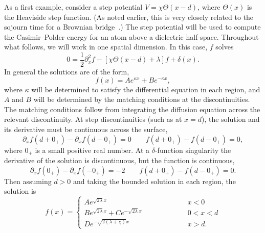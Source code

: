 As a first example, consider a step potential $V=\chi\Theta(x-d)$, where $\Theta(x)$ is the Heaviside step
function.  (As noted earlier, this is very closely related to the sojourn time for a Brownian bridge~\cite{Hooghiemstra2002}.)
The step potential will be used to compute the Casimir--Polder energy for an atom 
above a dielectric half-space.
Throughout what follows, we will work in one spatial dimension.  
In this case, $f$ solves
\begin{equation}
  0 = \frac{1}{2}\partial_x^2 f - [\chi\Theta(x-d)+\lambda]f + \delta(x).
\end{equation}
In general the solutions are of the form, 
\begin{equation}
  f(x) = A e^{\kappa x} + B e^{-\kappa x},
\end{equation}
where $\kappa$ will be determined to satisfy the differential equation in each region, and $A$ and $B$ will be determined by 
the matching conditions at the discontinuities.
The matching conditions follow from integrating the diffusion equation across the relevant discontinuity.  
At step discontinuities (such as at $x=d$), the solution and its derivative must be continuous across the surface,
    \begin{equation}
      \partial_xf(d+0_+) - \partial_x f(d-0_+) = 0 \qquad f(d+0_+)-f(d-0_+) = 0,  \label{eq:step_BC}
    \end{equation}
    where $0_+$ is a small positive real number.
At a $\delta$-function singularity the derivative of the solution is discontinuous, but the function
is continuous,
    \begin{equation}
      \partial_xf(0_+) -\partial_x f(-0_+) = -2  \qquad f(d+0_+)-f(d-0_+) = 0.\label{eq:delta_BC}
    \end{equation}
    Then assuming $d>0$ and taking the bounded solution in each region, the solution is 
\begin{equation}
  f(x) =\left\{ 
    \begin{array}{lcr}  A e^{\sqrt{2\lambda} x} & \hspace{2cm} & x<0\\
      B e^{\sqrt{2\lambda}x} + Ce^{-\sqrt{2\lambda}x} & \hspace{2cm} & 0<x<d\\
      D e^{-\sqrt{2(\lambda+\chi)}x} & \hspace{2cm} & x>d.
    \end{array}
  \right.
\end{equation}
